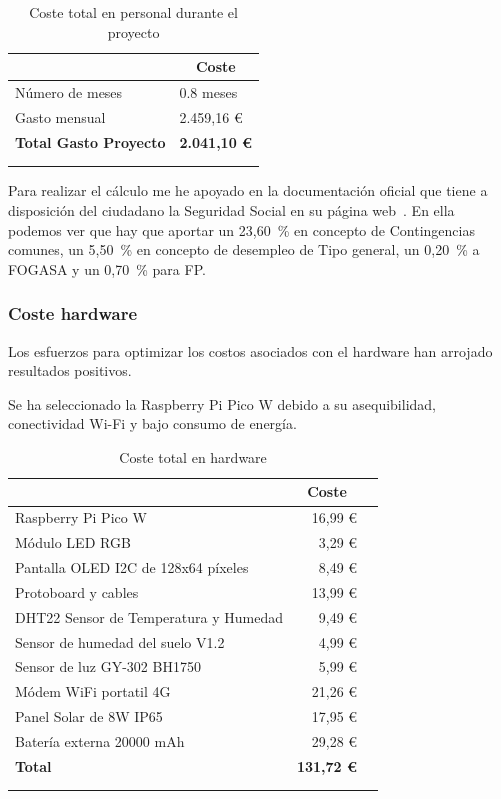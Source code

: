 \begin{longtable}[c]{@{}ll@{}}
\toprule
\centering
\multicolumn{1}{c}{\textbf{Concepto}} & \multicolumn{1}{c}{\textbf{Coste}} \\* \midrule
\endfirsthead
%
\endhead
%
\bottomrule
\endfoot
%
\endlastfoot
%
Número de meses & 0.8 meses \\
Gasto mensual & 2.459,16 € \\ \hline
\textbf{Total Gasto Proyecto} & \textbf{2.041,10 €} \\* \bottomrule \\
\caption{Coste total en personal durante el proyecto}
\label{tab:CostePersonalTotal}\\
\end{longtable}

Para realizar el cálculo me he apoyado en la documentación oficial que tiene a disposición del ciudadano la Seguridad Social en su página web~\cite{manual:SegurirdadSocial}. En ella podemos ver que hay que aportar un 23,60~\% en concepto de Contingencias comunes, un 5,50~\% en concepto de desempleo de Tipo general, un 0,20~\% a FOGASA y un 0,70~\% para FP.

\subsubsection{Coste hardware}
Los esfuerzos para optimizar los costos asociados con el hardware han arrojado resultados positivos.

Se ha seleccionado la Raspberry Pi Pico W debido a su asequibilidad, conectividad Wi-Fi y bajo consumo de energía.


\begin{longtable}[c]{@{}lrr@{}}
\toprule
\centering
\multicolumn{1}{c}{\textbf{Concepto}} & \multicolumn{1}{c}{\textbf{Coste}} \\* \midrule
\endfirsthead
%
\endhead
%
\bottomrule
\endfoot
%
\endlastfoot
%
Raspberry Pi Pico W & 16,99 €\\
Módulo LED RGB & 3,29 €\\
Pantalla OLED I2C de 128x64 píxeles & 8,49 €\\
Protoboard y cables & 13,99 €\\
DHT22 Sensor de Temperatura y Humedad & 9,49 €\\
Sensor de humedad del suelo V1.2 & 4,99 €\\
Sensor de luz GY-302 BH1750 & 5,99 €\\
Módem WiFi portatil 4G & 21,26 €\\
Panel Solar de 8W IP65 & 17,95 €\\
Batería externa 20000 mAh & 29,28 €\\
\textbf{Total} & \textbf{131,72 €} \\ \bottomrule \\
\caption{Coste total en hardware}
\label{tab:CosteHW}
\end{longtable}

